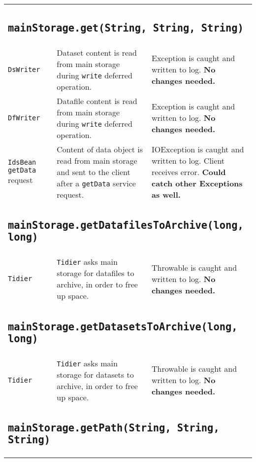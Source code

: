 \documentclass[paper=a4]{scrartcl}
\begin{document}
\begin{longtable}{ p{32mm} | p{48mm} | p{48mm} }
    \multicolumn{3}{p{\textwidth}}{
      \subsection{\texttt{mainStorage.get(String, String, String)}}
    } \\

    \raggedright \texttt{DsWriter} &
    \raggedright Dataset content is read from main storage during \texttt{write} deferred operation. &
    \raggedright Exception is caught and written to log. \textbf{No changes needed.}
    \tabularnewline[4mm]
    \raggedright \texttt{DfWriter} &
    \raggedright Datafile content is read from main storage during \texttt{write} deferred operation. &
    \raggedright Exception is caught and written to log. \textbf{No changes needed.}
    \tabularnewline[4mm]
    \raggedright \texttt{IdsBean} \texttt{getData} request &
    \raggedright Content of data object is read from main storage and sent to the client after a \texttt{getData} service request. &
    \raggedright IOException is caught and written to log. Client receives error. \textbf{Could catch other Exceptions as well.}
    \tabularnewline

    \multicolumn{3}{p{\textwidth}}{
      \subsection{\texttt{mainStorage.getDatafilesToArchive(long, long)}}
    } \\

    \texttt{Tidier} &
    \raggedright \texttt{Tidier} asks main storage for datafiles to archive, in order to free up space. &
    \raggedright Throwable is caught and written to log. \textbf{No changes needed.}
    \tabularnewline

    \multicolumn{3}{p{\textwidth}}{
      \subsection{\texttt{mainStorage.getDatasetsToArchive(long, long)}}
    } \\

    \texttt{Tidier} &
    \raggedright \texttt{Tidier} asks main storage for datasets to archive, in order to free up space. &
    \raggedright Throwable is caught and written to log. \textbf{No changes needed.}
    \tabularnewline

    \multicolumn{3}{p{\textwidth}}{
      \subsection{\texttt{mainStorage.getPath(String, String, String)}}
    } \\


\end{longtable}
\end{document}
